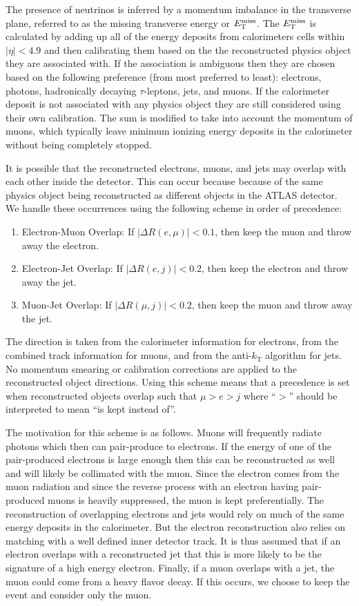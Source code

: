 The presence of neutrinos is inferred by a momentum
imbalance in the transverse plane, referred to as the missing
transverse energy or $E_{\mathrm{T}}^{\mathrm{miss}}$. The $E_{\mathrm{T}}^{\mathrm{miss}}$ is calculated by 
adding up all of 
the energy deposits from calorimeters cells within $|\eta| < 4.9$
and then calibrating them based on the the reconstructed
physics object they are associated with.
If the association is ambiguous then they are chosen based on the following
preference (from most preferred to least): electrons, photons, 
hadronically decaying $\tau$-leptons, jets, and muons.
If the calorimeter deposit is not associated with any physics object
they are still considered using their own calibration.
The sum is modified to take into account the momentum of muons,
which typically leave minimum ionizing energy deposits
in the calorimeter without being completely stopped.



It is possible that the reconstructed electrons, muons, and jets
may overlap with each other inside the detector.  This can occur
because because of the same physics object being reconstructed as different
objects in the ATLAS detector.  We handle these occurrences using the following
scheme in order of precedence:
\begin{enumerate}
	\item Electron-Muon Overlap: If $|\Delta R(e,\mu)| < 0.1$, 
	then keep the muon and throw away the electron.
	\item Electron-Jet Overlap: If $|\Delta R(e,j)| < 0.2$, 
	then keep the electron and throw away the jet.
	\item Muon-Jet Overlap: If $|\Delta R(\mu,j)| < 0.2$, 
	then keep the muon and throw away the jet.
\end{enumerate}
The direction is taken from the calorimeter information for electrons,
from the combined track information for muons, and from the anti-$k_{\mathrm{T}}$
algorithm for jets.
No momentum smearing or calibration corrections
are applied to the reconstructed object directions. 
Using this scheme means that a precedence is set when 
reconstructed objects overlap such that $\mu > e > j$ where ``$>$'' should
be interpreted to mean ``is kept instead of''. 

The motivation for this scheme
is as follows. Muons will frequently radiate photons which then can pair-produce
to electrons.  If the energy of one of the pair-produced electrons is 
large enough then this can be reconstructed as well and will likely be collimated
with the muon.  Since the electron comes from the muon radiation and
since the reverse process with an electron having pair-produced muons
is heavily suppressed, the muon is kept preferentially.  The reconstruction
of overlapping electrons and jets
would rely on much of the same energy deposits in the calorimeter.  But the electron
reconstruction also relies on matching with a well defined inner detector
track.  It is thus assumed that if an electron overlaps with a reconstructed
jet that this is more likely to be the signature of a high energy electron.
Finally, if a muon overlaps with a jet, the muon could come from a heavy flavor 
decay. If this occurs, we choose to keep the event and consider only the muon.


